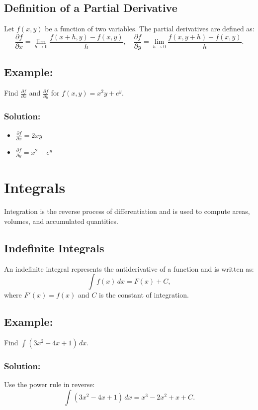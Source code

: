\documentclass[12pt]{article}
\begin{document}
\subsection*{Definition of a Partial Derivative}
Let $f(x, y)$ be a function of two variables. The partial derivatives are defined as:
\[ \frac{\partial f}{\partial x} = \lim_{h \to 0} \frac{f(x + h, y) - f(x, y)}{h}, \quad \frac{\partial f}{\partial y} = \lim_{h \to 0} \frac{f(x, y + h) - f(x, y)}{h}. \]

\subsection*{Example:}
Find $\frac{\partial f}{\partial x}$ and $\frac{\partial f}{\partial y}$ for $f(x, y) = x^2y + e^y$.

\subsubsection*{Solution:}
\begin{itemize}
    \item $\frac{\partial f}{\partial x} = 2xy$
    \item $\frac{\partial f}{\partial y} = x^2 + e^y$
\end{itemize}

\section{Integrals}
Integration is the reverse process of differentiation and is used to compute areas, volumes, and accumulated quantities.

\subsection{Indefinite Integrals}
An indefinite integral represents the antiderivative of a function and is written as:
\[ \int f(x)\,dx = F(x) + C, \]
where $F'(x) = f(x)$ and $C$ is the constant of integration.

\subsection*{Example:}
Find $\int (3x^2 - 4x + 1)\,dx$.

\subsubsection*{Solution:}
Use the power rule in reverse:
\[ \int (3x^2 - 4x + 1)\,dx = x^3 - 2x^2 + x + C. \]
\end{document}
